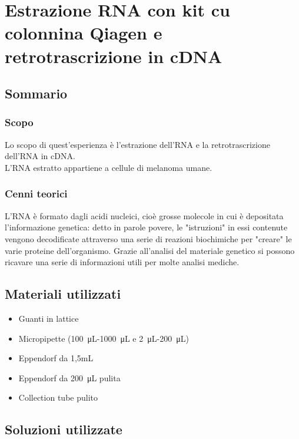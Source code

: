 \chapter{Estrazione RNA con kit cu colonnina Qiagen e retrotrascrizione in cDNA} %

\section{Sommario}

\subsection{Scopo}
Lo scopo di quest'esperienza è l'estrazione dell'RNA e la retrotrascrizione dell'RNA in cDNA. \\
L'RNA estratto appartiene a cellule di melanoma umane.

\subsection{Cenni teorici}

L'RNA è formato dagli acidi nucleici, cioè grosse molecole in cui è depositata
l'informazione genetica: detto in parole povere, le "istruzioni" in essi contenute
vengono decodificate attraverso una serie di reazioni biochimiche per "creare" le varie proteine dell'organismo.
Grazie all'analisi del materiale genetico si possono ricavare una serie di informazioni utili per molte analisi mediche.

\section{Materiali utilizzati}

\begin{itemize}
\item Guanti in lattice
\item Micropipette (\SI{100}{\micro\liter}-\SI{1000}{\micro\liter} e \SI{2}{\micro\liter}-\SI{200}{\micro\liter})
\item Eppendorf da 1,5mL
\item Eppendorf da \SI{200}{\micro\liter} pulita
\item Collection tube pulito
\end{itemize}

\section{Soluzioni utilizzate}

